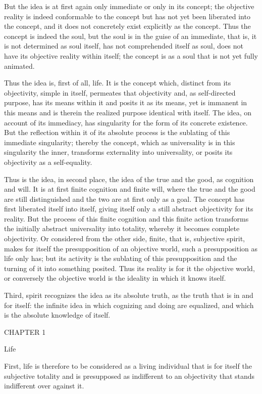 But the idea is at first again only immediate or only in its concept;
the objective reality is indeed conformable to the concept
but has not yet been liberated into the concept,
and it does not concretely exist explicitly as the concept.
Thus the concept is indeed the soul,
but the soul is in the guise of an immediate,
that is, it is not determined as soul itself,
has not comprehended itself as soul,
does not have its objective reality within itself;
the concept is as a soul that is not yet fully animated.

Thus the idea is, first of all, life.
It is the concept which, distinct from its objectivity,
simple in itself, permeates that objectivity
and, as self-directed purpose, has its means within it
and posits it as its means, yet is immanent in this means
and is therein the realized purpose identical with itself.
The idea, on account of its immediacy, has singularity
for the form of its concrete existence.
But the reflection within it of its absolute process is
the sublating of this immediate singularity;
thereby the concept, which as universality is
in this singularity the inner,
transforms externality into universality,
or posits its objectivity as a self-equality.

Thus is the idea, in second place,
the idea of the true and the good,
as cognition and will.
It is at first finite cognition and finite will,
where the true and the good are still distinguished
and the two are at first only as a goal.
The concept has first liberated itself into itself,
giving itself only a still abstract objectivity for its reality.
But the process of this finite cognition and this finite action
transforms the initially abstract universality into totality,
whereby it becomes complete objectivity.
Or considered from the other side,
finite, that is, subjective spirit,
makes for itself the
presupposition of an objective world,
such a presupposition as life only has;
but its activity is the sublating of this presupposition
and the turning of it into something posited.
Thus its reality is for it the objective world,
or conversely the objective world is
the ideality in which it knows itself.

Third, spirit recognizes the idea as its absolute truth,
as the truth that is in and for itself:
the infinite idea in which cognizing and doing are equalized,
and which is the absolute knowledge of itself.

CHAPTER 1

Life

First, life is therefore to be considered as a living individual
that is for itself the subjective totality
and is presupposed as indifferent to an objectivity
that stands indifferent over against it.

